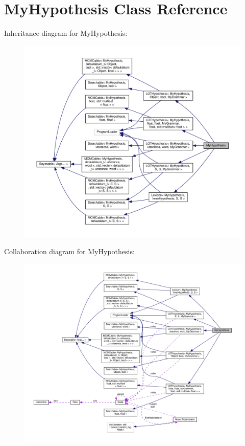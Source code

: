 \hypertarget{class_my_hypothesis}{}\section{My\+Hypothesis Class Reference}
\label{class_my_hypothesis}


Inheritance diagram for My\+Hypothesis\+:\nopagebreak
\begin{figure}[H]
\begin{center}
\leavevmode
\includegraphics[width=350pt]{class_my_hypothesis__inherit__graph}
\end{center}
\end{figure}


Collaboration diagram for My\+Hypothesis\+:\nopagebreak
\begin{figure}[H]
\begin{center}
\leavevmode
\includegraphics[width=350pt]{class_my_hypothesis__coll__graph}
\end{center}
\end{figure}
